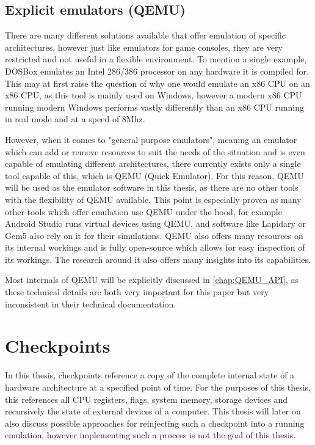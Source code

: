 \subsection{Explicit emulators (QEMU)}
There are many different solutions available that offer emulation of specific architectures,
however just like emulators for game consoles, they are very restricted and not useful in a flexible environment.
To mention a single example, DOSBox emulates an Intel 286/386 processor on any hardware it is compiled for.
This may at first raise the question of why one would emulate an x86 CPU on an x86 CPU,
as this tool is mainly used on Windows,
however a modern x86 CPU running modern Windows performs vastly differently than
an x86 CPU running in real mode and at a speed of 8Mhz.

However, when it comes to "general purpose emulators",
meaning an emulator which can add or remove resources to suit the needs of the situation
and is even capable of emulating different architectures,
there currently exists only a single tool capable of this,
which is QEMU (Quick Emulator).
For this reason, QEMU will be used as the emulator software in this thesis,
as there are no other tools with the flexibility of QEMU available.
This point is especially proven as many other tools which offer emulation
use QEMU under the hood, for example Android Studio runs virtual devices using QEMU,
and software like Lapidary\cite{lapidary} or Gem5\cite{gem5} also rely on it for their simulations.
QEMU also offers many resources on its internal workings and is fully open-source
which allows for easy inspection of its workings.
The research around it also offers many insights into its capabilities.

Most internals of QEMU will be explicitly discussed in \autoref{chap:QEMU_API},
as these technical details are both very important for this paper
but very inconsistent in their technical documentation.

\section{Checkpoints}
In this thesis, checkpoints reference a copy of the complete internal state of a hardware architecture at a specified point of time.
For the purposes of this thesis, this references all CPU registers, flags, system memory,
storage devices and recursively the state of external devices of a computer.
This thesis will later on also discuss possible approaches for reinjecting such a checkpoint
into a running emulation, however implementing such a process is not the goal of this thesis.

